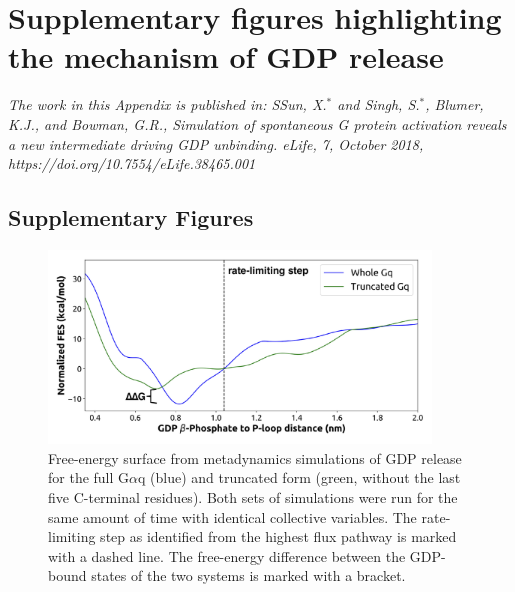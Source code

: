 \documentclass[../main.tex]{subfiles}
\begin{document}
	
	\graphicspath{{AppendixB/}}
	\chapter{Supplementary figures highlighting the mechanism of GDP release}
	\label{ch:cards-supp-info}
	
    \textit{The work in this Appendix is published in: SSun, X.$^*$ and Singh, S.$^*$, Blumer, K.J., and Bowman, G.R., Simulation of spontaneous G protein activation reveals a new intermediate driving GDP unbinding. eLife, 7, October 2018, https://doi.org/10.7554/eLife.38465.001} \cite{Sun:2018kx}  

	
\section{Supplementary Figures}
        \begin{figure}[!htb] %
        \centering
        \includegraphics[width=4in]{ch4-fig2-supp1.png}
        \caption[Free-energy surface from metadynamics simulations of GDP release for the full G$\alpha$q (blue) and truncated form (green, without the last five C-terminal residues).]
            {Free-energy surface from metadynamics simulations of GDP release for the full G$\alpha$q (blue) and truncated form (green, without the last five C-terminal residues). Both sets of simulations were run for the same amount of time with identical collective variables. The rate-limiting step as identified from the highest flux pathway is marked with a dashed line. The free-energy difference between the GDP-bound states of the two systems is marked with a bracket.}
        \label{fig:ch4-fig2-supp1}
    \end{figure}
\end{document}
